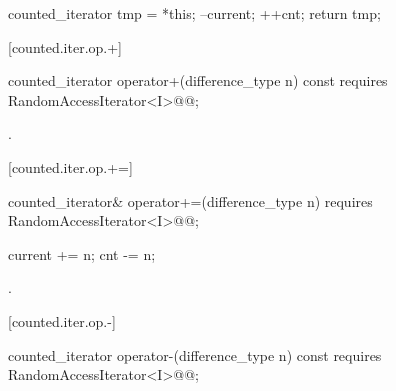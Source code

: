 \begin{addedblock}
\begin{itemdescr}
\pnum
\effects
\begin{codeblock}
counted_iterator tmp = *this;
--current;
++cnt;
return tmp;
\end{codeblock}
\end{itemdescr}

[counted.iter.op.+]{}

%
%
\begin{itemdecl}
  counted_iterator operator+(difference_type n) const
    requires RandomAccessIterator<I>@\newtxt{()}@;
\end{itemdecl}

\begin{itemdescr}
\pnum
\requires {}

\pnum
\returns {}.
\end{itemdescr}

[counted.iter.op.+=]{}

%
%
\begin{itemdecl}
  counted_iterator& operator+=(difference_type n)
    requires RandomAccessIterator<I>@\newtxt{()}@;
\end{itemdecl}

\begin{itemdescr}
\pnum
\requires {}

\pnum
\effects
\begin{codeblock}
current += n;
cnt -= n;
\end{codeblock}

\pnum
\returns {}.
\end{itemdescr}

[counted.iter.op.-]{}

%
%
\begin{itemdecl}
  counted_iterator operator-(difference_type n) const
    requires RandomAccessIterator<I>@\newtxt{()}@;
\end{itemdecl}

\begin{itemdescr}
\pnum
\requires {}


\end{itemdescr}
\end{addedblock}
